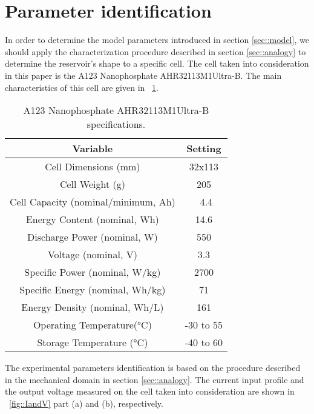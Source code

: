 \documentclass[journal]{IEEEtran}
\begin{document}
\section{Parameter identification}
\label{sec::parameter}
In order to determine the model parameters introduced in section \ref{sec::model}, we should apply the characterization procedure described in section \ref{sec::analogy} to determine the reservoir's shape to a specific cell.
The cell taken into consideration in this paper is the A123 Nanophosphate AHR32113M1Ultra-B. The main characteristics of this cell are given in \tablename~\ref{tab::A123_32113_specs}.
\begin{table}[htbph]
\centering
\begin{tabular}{cc}
Variable & Setting  \\
\hline
\hline
Cell Dimensions (mm) & 32x113 \\
Cell Weight (g) & 205 \\
Cell Capacity (nominal/minimum, Ah) & ~4.4 \\
Energy Content (nominal, Wh) & 14.6 \\
Discharge Power (nominal, W) & 550 \\
Voltage (nominal, V) & 3.3\\
Specific Power (nominal, W/kg) & 2700 \\
Specific Energy (nominal, Wh/kg) & 71 \\
Energy Density (nominal, Wh/L) & 161 \\
Operating Temperature(°C) & -30 to 55 \\
Storage Temperature (°C) & -40 to 60 \\
\end{tabular}
\caption{A123 Nanophosphate AHR32113M1Ultra-B specifications.}
\label{tab::A123_32113_specs}
\end{table}
The experimental parameters identification is based on the procedure described in the mechanical domain in section \ref{sec::analogy}. 
The current input profile and the output voltage measured on the cell taken into consideration are shown in \figurename~\ref{fig::IandV} part (a) and (b), respectively.
\end{document}
